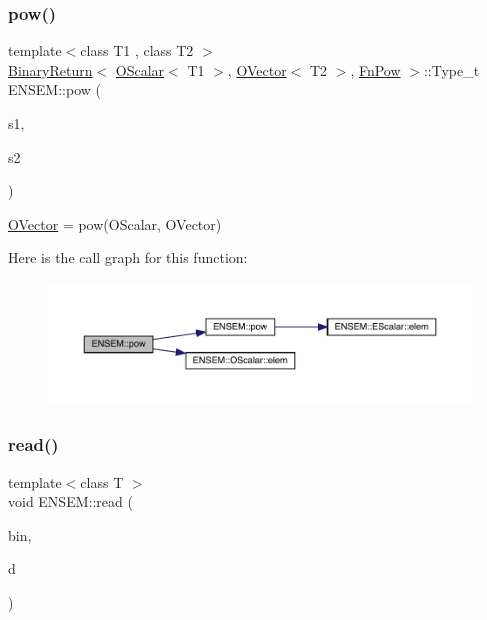 \subsubsection{\texorpdfstring{pow()}{pow()}\hspace{0.1cm}{\footnotesize\ttfamily [3/3]}}
{\footnotesize\ttfamily template$<$class T1 , class T2 $>$ \\
\mbox{\hyperlink{structENSEM_1_1BinaryReturn}{Binary\+Return}}$<$ \mbox{\hyperlink{classENSEM_1_1OScalar}{O\+Scalar}}$<$ T1 $>$, \mbox{\hyperlink{classENSEM_1_1OVector}{O\+Vector}}$<$ T2 $>$, \mbox{\hyperlink{structENSEM_1_1FnPow}{Fn\+Pow}} $>$\+::Type\+\_\+t E\+N\+S\+E\+M\+::pow (\begin{DoxyParamCaption}\item[{const \mbox{\hyperlink{classENSEM_1_1OScalar}{O\+Scalar}}$<$ T1 $>$ \&}]{s1,  }\item[{const \mbox{\hyperlink{classENSEM_1_1OVector}{O\+Vector}}$<$ T2 $>$ \&}]{s2 }\end{DoxyParamCaption})\hspace{0.3cm}{\ttfamily [inline]}}



\mbox{\hyperlink{classENSEM_1_1OVector}{O\+Vector}} = pow(\+O\+Scalar, O\+Vector) 

Here is the call graph for this function\+:\nopagebreak
\begin{figure}[H]
\begin{center}
\leavevmode
\includegraphics[width=350pt]{da/d59/group__obsvector_ga3466dc3452f93c110d8adba91bf1e85a_cgraph}
\end{center}
\end{figure}
\mbox{\label{group__obsvector_ga78b51667ce539bc967764a39c77afbe0}} 
\subsubsection{\texorpdfstring{read()}{read()}}
{\footnotesize\ttfamily template$<$class T $>$ \\
void E\+N\+S\+E\+M\+::read (\begin{DoxyParamCaption}\item[{\mbox{\hyperlink{classADATIO_1_1BinaryReader}{A\+D\+A\+T\+I\+O\+::\+Binary\+Reader}} \&}]{bin,  }\item[{\mbox{\hyperlink{classENSEM_1_1OVector}{O\+Vector}}$<$ T $>$ \&}]{d }\end{DoxyParamCaption})\hspace{0.3cm}{\ttfamily [inline]}}



